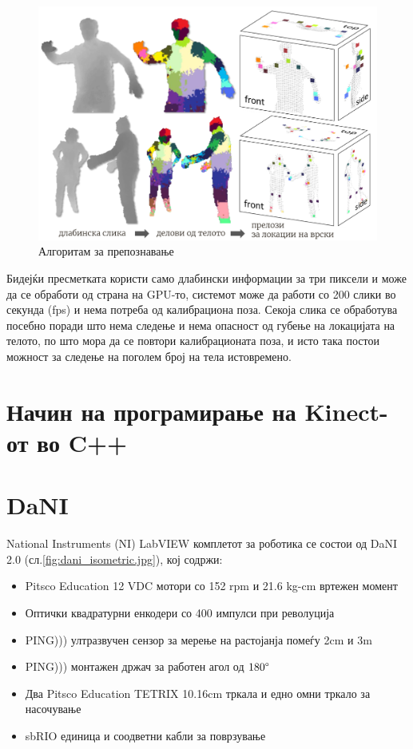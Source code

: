 \documentclass[12pt]{article}
\begin{document}
  \begin{figure}[H]
    \includegraphics[width=0.75\linewidth]{./images/bodyparts.png}
    \centering
    \caption{Алгоритам за препознавање}
    \label{fig:bodyparts.png}
    \end{figure}
    
  Бидејќи пресметката користи само длабински информации за три пиксели и може да се обработи од страна на GPU-то, системот може да работи со 200 слики во секунда (fps) и нема потреба од калибрациона поза. Секоја слика се обработува посебно поради што нема следење и нема опасност од губење на локацијата на телото, по што мора да се повтори калибрационата поза, и исто така постои можност за следење на поголем број на тела истовремено.

\newpage

\section{Начин на програмирање на Kinect-от во C++}

\newpage

\section{DaNI}
	National Instruments (NI) LabVIEW комплетот за роботика се состои од DaNI 2.0 (сл.\ref{fig:dani_isometric.jpg}), кој содржи:

	\begin{itemize}
		\item Pitsco Education 12 VDC мотори со 152 rpm и 21.6 kg-cm вртежен момент
		\item Оптички квадратурни енкодери со 400 импулси при револуција
		\item PING))) ултразвучен сензор за мерење на растојанја помеѓу 2cm и 3m
		\item PING))) монтажен држач за работен агол од $180 \degree$
		\item Два Pitsco Education TETRIX 10.16cm тркала и едно омни тркало за насочување
		\item sbRIO единица и соодветни кабли за поврзување
		\end{itemize}
\end{document}
